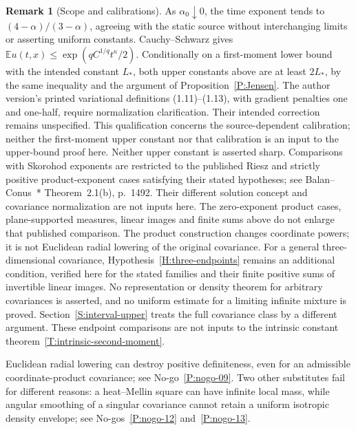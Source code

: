 \documentclass[12pt,oneside,openany]{book}
\numberwithin{equation}{section}
\theoremstyle{nogostyle}
\theoremstyle{definition}
\newtheorem{remark}[theorem]{Remark}
\newcommand{\E}{\mathbb{E}}
\begin{document}
\begin{remark}[Scope and calibrations]\label{R:three-endpoint-scope}
  As $\alpha_0\downarrow0$, the time exponent tends to $(4-\alpha)/(3-\alpha)$,
  agreeing with the static source without interchanging limits or asserting
  uniform constants. Cauchy--Schwarz gives $\E u(t,x) \le
  \exp(qC^{1/q}t^\kappa/2)$. Conditionally on a first-moment lower bound with
  the intended constant $L_*$, both upper constants above are at least $2L_*$,
  by the same inequality and the argument of Proposition~\ref{P:Jensen}. The
  author version's printed variational definitions (1.11)--(1.13), with gradient
  penalties one and one-half, require normalization clarification. Their
  intended correction remains unspecified. This qualification concerns the
  source-dependent calibration; neither the first-moment upper constant nor that
  calibration is an input to the upper-bound proof here. Neither upper constant
  is asserted sharp. Comparisons with Skorohod exponents are restricted to the
  published Riesz and strictly positive product-exponent cases satisfying their
  stated hypotheses; see Balan--Conus~\cite{balan.conus:16:intermittency}*{
  Theorem~2.1(b), p.~1492}. Their different solution concept and covariance
  normalization are not inputs here. The zero-exponent product cases,
  plane-supported measures, linear images and finite sums above do not enlarge
  that published comparison. The product construction changes coordinate powers;
  it is not Euclidean radial lowering of the original covariance. For a general
  three-dimensional covariance, Hypothesis~\ref{H:three-endpoints} remains an
  additional condition, verified here for the stated families and their finite
  positive sums of invertible linear images. No representation or density
  theorem for arbitrary covariances is asserted, and no uniform estimate for a
  limiting infinite mixture is proved. Section~\ref{S:interval-upper} treats the
  full covariance class by a different argument. These endpoint comparisons are
  not inputs to the intrinsic constant theorem~\ref{T:intrinsic-second-moment}.
\end{remark}

Euclidean radial lowering can destroy positive definiteness, even for an
admissible coordinate-product covariance; see No-go~\ref{P:nogo-09}.
Two other substitutes fail for different reasons: a heat--Mellin square can
have infinite local mass, while angular smoothing of a singular covariance
cannot retain a uniform isotropic density envelope; see
No-gos~\ref{P:nogo-12} and~\ref{P:nogo-13}.
\end{document}
